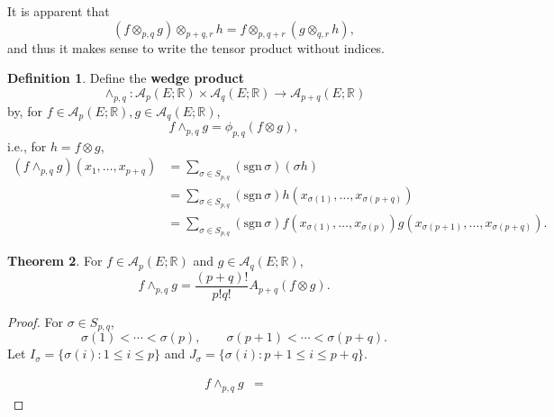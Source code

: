 \documentclass{article}
\newcommand{\sgn}{\mathrm{sgn}\,}
\theoremstyle{definition}
\newtheorem{theorem}{Theorem}
\theoremstyle{definition}
\newtheorem{definition}[theorem]{Definition}
\begin{document}
It is apparent that
\[
(f \otimes_{p,q} g) \otimes_{p+q,r} h 
=f \otimes_{p,q+r} (g \otimes_{q,r} h),
\]
and thus it makes sense to write the tensor product without indices.

\begin{definition}
Define the \textbf{wedge product} 
\[
\wedge_{p,q}:\mathscr{A}_p(E;\mathbb{R}) \times \mathscr{A}_q(E;\mathbb{R}) \to 
\mathscr{A}_{p+q}(E;\mathbb{R})
\]
by, for $f \in \mathscr{A}_p(E;\mathbb{R}), g \in \mathscr{A}_q(E;\mathbb{R})$,
\[
f \wedge_{p,q} g = \phi_{p,q}(f \otimes g),
\]
i.e., for $h = f \otimes g$,
\begin{align*}
(f \wedge_{p,q} g)(x_1,\ldots,x_{p+q}) &= 
\sum_{\sigma \in S_{p,q}} (\sgn \sigma) (\sigma h)\\
&=\sum_{\sigma \in S_{p,q}} (\sgn \sigma) h(x_{\sigma(1)},\ldots,x_{\sigma(p+q)})\\
&=\sum_{\sigma \in S_{p,q}} (\sgn \sigma) f(x_{\sigma(1)},\ldots,x_{\sigma(p)}) g(x_{\sigma(p+1)},\ldots,x_{\sigma(p+q)}).
\end{align*}
\end{definition}


\begin{theorem}
For $f \in \mathscr{A}_p(E;\mathbb{R})$ and $g \in \mathscr{A}_q(E;\mathbb{R})$,
\[
f \wedge_{p,q} g = \frac{(p+q)!}{p!q!} A_{p+q}(f \otimes g).
\]
\end{theorem}
\begin{proof}
For $\sigma \in S_{p,q}$,
\[
\sigma(1)<\cdots<\sigma(p),\qquad \sigma(p+1)<\cdots<\sigma(p+q).
\]
Let $I_\sigma=\{\sigma(i): 1 \leq i \leq p\}$ and $J_\sigma = 
\{\sigma(i): p+1 \leq i \leq p+q\}$. 

\begin{align*}
f \wedge_{p,q} g&=
\end{align*}
\end{proof}
\end{document}

